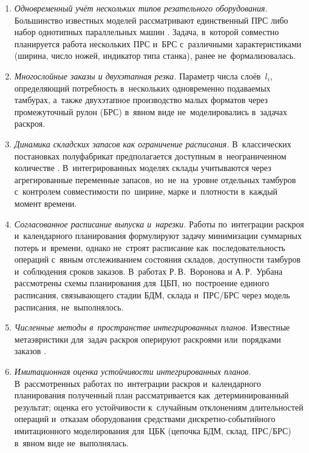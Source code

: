 \begin{enumerate}
  \item \textit{Одновременный учёт нескольких типов резательного оборудования.}
  Большинство известных моделей рассматривают единственный ПРС либо набор однотипных параллельных машин \cite{giannelos2001parallel,gilmore1961linear}.
  Задача, в~которой совместно планируется работа нескольких ПРС и~БРС с~различными характеристиками (ширина, число ножей, индикатор типа станка), ранее не~формализовалась.
  \item \textit{Многослойные заказы и двухэтапная резка.}
  Параметр числа слоёв~$l_i$, определяющий потребность в~нескольких одновременно подаваемых тамбурах, а~также двухэтапное производство малых форматов через промежуточный рулон (БРС) в~явном виде не~моделировались в~задачах раскроя.
  \item \textit{Динамика складских запасов как ограничение расписания.}
  В~классических постановках полуфабрикат предполагается доступным в~неограниченном количестве \cite{gilmore1961linear,delorme2016bin}.
  В~интегрированных моделях \cite{nonas2000combined,leao2016decomposition} склады учитываются через агрегированные переменные запасов, но~не~на~уровне отдельных тамбуров с~контролем совместимости по~ширине, марке и~плотности в~каждый момент времени.
  \item \textit{Согласованное расписание выпуска и~нарезки.}
  Работы по~интеграции раскроя и~календарного планирования \cite{harjunkoski1996trimloss,westerlund1998trimloss_scheduling} формулируют задачу минимизации суммарных потерь и~времени, однако не~строят расписание как~последовательность операций с~явным отслеживанием состояния складов, доступности тамбуров и~соблюдения сроков заказов.
  В~работах Р.\,В.~Воронова \cite{воронов2004диссертация} и А.\,Р.~Урбана \cite{урбан2015диссертация} рассмотрены схемы планирования для~ЦБП, но~построение единого расписания, связывающего стадии БДМ, склада и~ПРС/БРС через модель расписания, не~выполнялось.
  \item \textit{Численные методы в~пространстве интегрированных планов.}
  Известные метаэвристики для~задач раскроя оперируют раскроями или~порядками заказов \cite{haessler1991,araujo2014genetic}.
  \item \textit{Имитационная оценка устойчивости интегрированных планов.}
  В~рассмотренных работах по~интеграции раскроя и~календарного планирования полученный план рассматривается как~детерминированный результат; оценка его устойчивости к~случайным отклонениям длительностей операций и~отказам оборудования средствами дискретно-событийного имитационного моделирования для~ЦБК (цепочка БДМ, склад, ПРС/БРС) в~явном виде не~выполнялась.
\end{enumerate}

